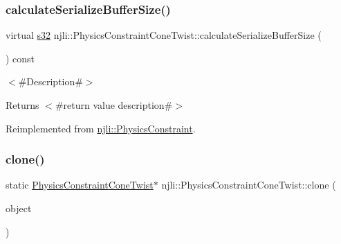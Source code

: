 \mbox{\label{classnjli_1_1_physics_constraint_cone_twist_a0d6e6a5ffced973aca49898094745d75}} 
\subsubsection{\texorpdfstring{calculate\+Serialize\+Buffer\+Size()}{calculateSerializeBufferSize()}}
{\footnotesize\ttfamily virtual \mbox{\hyperlink{_util_8h_aa62c75d314a0d1f37f79c4b73b2292e2}{s32}} njli\+::\+Physics\+Constraint\+Cone\+Twist\+::calculate\+Serialize\+Buffer\+Size (\begin{DoxyParamCaption}{ }\end{DoxyParamCaption}) const\hspace{0.3cm}{\ttfamily [virtual]}}

$<$\#\+Description\#$>$

\begin{DoxyReturn}{Returns}
$<$\#return value description\#$>$ 
\end{DoxyReturn}


Reimplemented from \mbox{\hyperlink{classnjli_1_1_physics_constraint_aeda6c35ab271897cfe3192870d4ac7a4}{njli\+::\+Physics\+Constraint}}.

\mbox{\label{classnjli_1_1_physics_constraint_cone_twist_aae501e94d550f61640012cda44d6d690}} 
\subsubsection{\texorpdfstring{clone()}{clone()}}
{\footnotesize\ttfamily static \mbox{\hyperlink{classnjli_1_1_physics_constraint_cone_twist}{Physics\+Constraint\+Cone\+Twist}}$\ast$ njli\+::\+Physics\+Constraint\+Cone\+Twist\+::clone (\begin{DoxyParamCaption}\item[{const \mbox{\hyperlink{classnjli_1_1_physics_constraint_cone_twist}{Physics\+Constraint\+Cone\+Twist}} \&}]{object }\end{DoxyParamCaption})\hspace{0.3cm}{\ttfamily [static]}}

